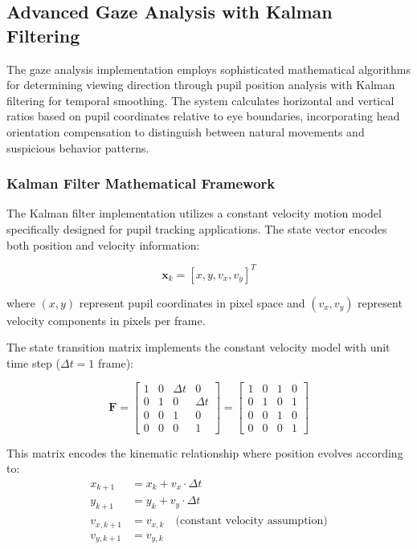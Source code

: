 \documentclass[conference]{IEEEtran}
\begin{document}
\subsection{Advanced Gaze Analysis with Kalman Filtering}

The gaze analysis implementation employs sophisticated mathematical algorithms for determining viewing direction through pupil position analysis with Kalman filtering for temporal smoothing\cite{kalman1960new}. The system calculates horizontal and vertical ratios based on pupil coordinates relative to eye boundaries, incorporating head orientation compensation to distinguish between natural movements and suspicious behavior patterns\cite{bar2001estimation}.

\subsubsection{Kalman Filter Mathematical Framework}

The Kalman filter implementation utilizes a constant velocity motion model specifically designed for pupil tracking applications\cite{welch2006introduction}. The state vector encodes both position and velocity information:

\begin{equation}
\mathbf{x}_k = [x, y, v_x, v_y]^T
\end{equation}

where $(x, y)$ represent pupil coordinates in pixel space and $(v_x, v_y)$ represent velocity components in pixels per frame.

The state transition matrix implements the constant velocity model with unit time step ($\Delta t = 1$ frame):

\begin{equation}
\mathbf{F} = \begin{bmatrix}
1 & 0 & \Delta t & 0 \\
0 & 1 & 0 & \Delta t \\
0 & 0 & 1 & 0 \\
0 & 0 & 0 & 1
\end{bmatrix} = \begin{bmatrix}
1 & 0 & 1 & 0 \\
0 & 1 & 0 & 1 \\
0 & 0 & 1 & 0 \\
0 & 0 & 0 & 1
\end{bmatrix}
\end{equation}

This matrix encodes the kinematic relationship where position evolves according to:
\begin{align}
x_{k+1} &= x_k + v_x \cdot \Delta t \\
y_{k+1} &= y_k + v_y \cdot \Delta t \\
v_{x,k+1} &= v_{x,k} \quad \text{(constant velocity assumption)} \\
v_{y,k+1} &= v_{y,k}
\end{align}
\end{document}
